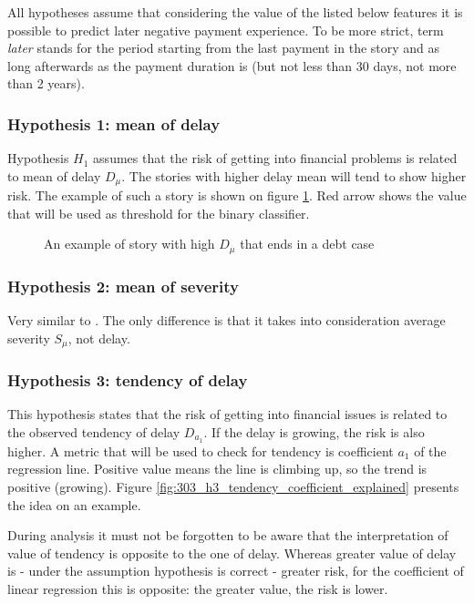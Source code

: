 \documentclass{article}
\begin{document}
All hypotheses assume that considering the value of the listed below features it is possible to predict later negative payment experience.
To be more strict, term \textit{later} stands for the period starting from the last payment in the story and as long afterwards
as the payment duration is (but not less than 30 days, not more than 2 years).

\subsubsection{Hypothesis 1: mean of delay}
\label{section:H1}

Hypothesis $H_1$ assumes that the risk of getting into financial problems is related to mean of delay $D_\mu$.
The stories with higher delay mean will tend to show higher risk.
The example of such a story is shown on figure \ref{fig:302_h1_delay_mean_explained}.
Red arrow shows the value that will be used as threshold for the binary classifier.

\begin{figure}[htbp!]
    \begin{center}
        
    \caption{An example of story with high $D_\mu$ that ends in a debt case}
    \label{fig:302_h1_delay_mean_explained}
    \end{center}
\end{figure}

\subsubsection{Hypothesis 2: mean of severity}

Very similar to .
The only difference is that it takes into consideration average severity $S_{\mu}$, not delay.

\subsubsection{Hypothesis 3: tendency of delay}
\label{section:H3}

This hypothesis states that the risk of getting into financial issues is related to the observed tendency of delay $D_{a_1}$.
If the delay is growing, the risk is also higher.
A metric that will be used to check for tendency is coefficient $a_1$ of the regression line.
Positive value means the line is climbing up, so the trend is positive (growing).
Figure \ref{fig:303_h3_tendency_coefficient_explained} presents the idea on an example.
\par During analysis it must not be forgotten to be aware that the interpretation of value of tendency is opposite to the one of delay.
Whereas greater value of delay is - under the assumption hypothesis is correct - greater risk,
for the coefficient of linear regression this is opposite: the greater value, the risk is lower.
\end{document}
